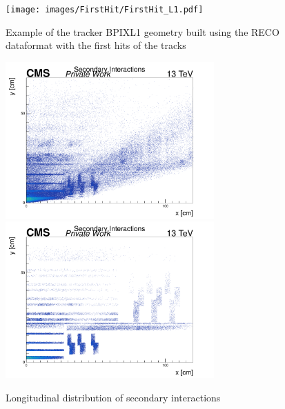 \documentclass{cernatlasnote}
\begin{document}
\begin{figure}[ht]
\centering
\texttt{[image: images/FirstHit/FirstHit\_L1.pdf]}
\caption{\label{fig:trackermap} Example of the tracker BPIXL1 geometry built using the RECO dataformat with the first hits of the tracks}
\end{figure}

\begin{figure}[ht]
\centering
\includegraphics[height=6cm, width=8cm, trim= 0cm 0cm 0cm 0.cm,clip]{images/SecInt/Z_R_Selec.pdf}\includegraphics[height=6cm, width=8cm, trim= 0cm 0cm 0cm 0.cm,clip]{images/SecInt/Z_R_TrackerMatched.pdf}
\caption{\label{fig:longVeto} Longitudinal distribution of secondary interactions}
\end{figure}
\end{document}
